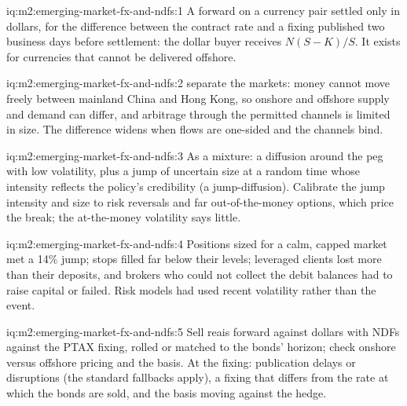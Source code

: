 \begin{solution}{iq:m2:emerging-market-fx-and-ndfs:1}
A forward on a currency pair settled only in dollars, for the difference between
the contract rate and a fixing published two business days before settlement:
the dollar buyer receives $N(S-K)/S$. It exists for currencies that cannot be
delivered offshore.
\end{solution}

\begin{solution}{iq:m2:emerging-market-fx-and-ndfs:2}
 separate the markets: money cannot move freely between
mainland China and Hong Kong, so onshore and offshore supply and demand can
differ, and arbitrage through the permitted channels is limited in size. The
difference widens when flows are one-sided and the channels bind.
\end{solution}

\begin{solution}{iq:m2:emerging-market-fx-and-ndfs:3}
As a mixture: a diffusion around the peg with low volatility, plus a jump of
uncertain size at a random time whose intensity reflects the policy's
credibility (a jump-diffusion). Calibrate the jump intensity and size to risk
reversals and far out-of-the-money options, which price the break; the at-the-money
volatility says little.
\end{solution}

\begin{solution}{iq:m2:emerging-market-fx-and-ndfs:4}
Positions sized for a calm, capped market met a 14\% jump; stops filled far below
their levels; leveraged clients lost more than their deposits, and brokers who
could not collect the debit balances had to raise capital or failed. Risk models
had used recent volatility rather than the event.
\end{solution}

\begin{solution}{iq:m2:emerging-market-fx-and-ndfs:5}
Sell reais forward against dollars with NDFs against the PTAX fixing, rolled or
matched to the bonds' horizon; check onshore versus offshore pricing and the
basis. At the fixing: publication delays or disruptions (the standard fallbacks
apply), a fixing that differs from the rate at which the bonds are sold, and
the basis moving against the hedge.
\end{solution}


